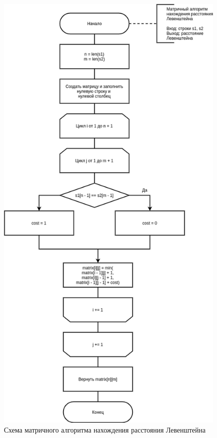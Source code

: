 \begin{figure}[H]
	\begin{center}
		\includegraphics[scale=0.5]{img/matrix.png}
	\end{center}
	\captionsetup{justification=centering}
	\caption{Схема матричного алгоритма нахождения расстояния Левенштейна}
	\label{img:matrix}
\end{figure}

